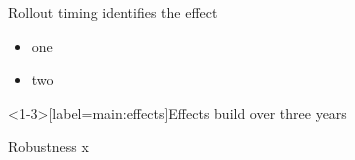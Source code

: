 \documentclass[11pt, aspectratio=169]{beamer}
\providecommand{\AppendixStart}{\appendix}
\begin{document}
\begin{frame}{Rollout timing identifies the effect}
  \begin{itemize}\item<1-> one \item<2-> two\end{itemize}
\end{frame}
\begin{frame}<1-3>[label=main:effects]{Effects build over three years}
\end{frame}
\AppendixStart
\begin{frame}{Robustness}\hypertarget{app:r}{} x \end{frame}
\end{document}
